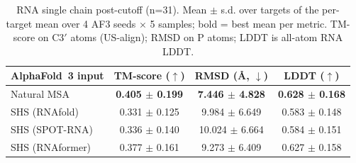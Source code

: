 \begin{table}[htbp]
\centering
\caption{RNA single chain post-cutoff (n=31). Mean $\pm$ s.d. over targets of the per-target mean over 4 AF3 seeds $\times$ 5 samples; bold = best mean per metric. TM-score on C3$'$ atoms (US-align); RMSD on P atoms; LDDT is all-atom RNA LDDT.}
\label{tab:rna_single_chain_post_cutoff}
\begin{tabular}{lccc}
\toprule
AlphaFold~3 input & TM-score ($\uparrow$) & RMSD (\AA, $\downarrow$) & LDDT ($\uparrow$) \\
\midrule
Natural MSA & \textbf{0.405 $\pm$ 0.199} & \textbf{7.446 $\pm$ 4.828} & \textbf{0.628 $\pm$ 0.168} \\
SHS (RNAfold) & 0.331 $\pm$ 0.125 & 9.984 $\pm$ 6.649 & 0.583 $\pm$ 0.148 \\
SHS (SPOT-RNA) & 0.336 $\pm$ 0.140 & 10.024 $\pm$ 6.664 & 0.584 $\pm$ 0.151 \\
SHS (RNAformer) & 0.377 $\pm$ 0.161 & 9.273 $\pm$ 6.409 & 0.627 $\pm$ 0.158 \\
\bottomrule
\end{tabular}
\end{table}
